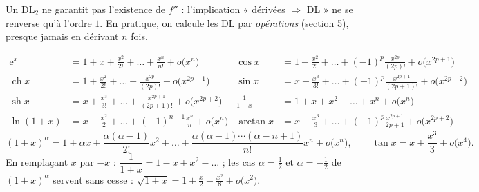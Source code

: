 \begin{attention}
Un $\mathrm{DL}_{2}$ ne garantit pas l'existence de $f''$ : l'implication
« dérivées $\Rightarrow$ DL » ne se renverse qu'à l'ordre $1$. En pratique,
on calcule les DL par \emph{opérations} (section 5), presque jamais en
dérivant $n$ fois.
\end{attention}


\begin{propriete}
\begin{align*}
\mathrm{e}^{x}&=1+x+\frac{x^{2}}{2!}+\dots+\frac{x^{n}}{n!}+o\bigl(x^{n}\bigr)
&\cos x&=1-\frac{x^{2}}{2!}+\dots+(-1)^{p}\frac{x^{2p}}{(2p)!}+o\bigl(x^{2p+1}\bigr)\\[0.6mm]
\operatorname{ch}x&=1+\frac{x^{2}}{2!}+\dots+\frac{x^{2p}}{(2p)!}+o\bigl(x^{2p+1}\bigr)
&\sin x&=x-\frac{x^{3}}{3!}+\dots+(-1)^{p}\frac{x^{2p+1}}{(2p+1)!}+o\bigl(x^{2p+2}\bigr)\\[0.6mm]
\operatorname{sh}x&=x+\frac{x^{3}}{3!}+\dots+\frac{x^{2p+1}}{(2p+1)!}+o\bigl(x^{2p+2}\bigr)
&\frac{1}{1-x}&=1+x+x^{2}+\dots+x^{n}+o\bigl(x^{n}\bigr)\\[0.6mm]
\ln(1+x)&=x-\frac{x^{2}}{2}+\dots+(-1)^{n-1}\frac{x^{n}}{n}+o\bigl(x^{n}\bigr)
&\arctan x&=x-\frac{x^{3}}{3}+\dots+(-1)^{p}\frac{x^{2p+1}}{2p+1}+o\bigl(x^{2p+2}\bigr)
\end{align*}
\[
(1+x)^{\alpha}=1+\alpha x+\frac{\alpha(\alpha-1)}{2!}x^{2}+\dots
  +\frac{\alpha(\alpha-1)\cdots(\alpha-n+1)}{n!}x^{n}+o\bigl(x^{n}\bigr),
\qquad
\tan x=x+\frac{x^{3}}{3}+o\bigl(x^{4}\bigr).
\]
En remplaçant $x$ par $-x$ : $\dfrac{1}{1+x}=1-x+x^{2}-\dots$ ; les cas
$\alpha=\tfrac12$ et $\alpha=-\tfrac12$ de $(1+x)^{\alpha}$ servent sans cesse :
$\sqrt{1+x}=1+\tfrac{x}{2}-\tfrac{x^{2}}{8}+o\bigl(x^{2}\bigr)$.
\end{propriete}

